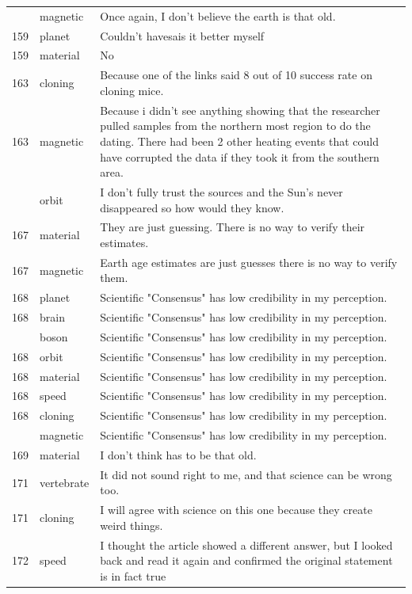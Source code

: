 \documentclass[
  doc,floatsintext]{apa6}
\begin{document}
\begin{longtable}[t]{>{}r>{}l>{\raggedright\arraybackslash}p{30em}}
\addlinespace
157 & magnetic & Once again, I don't believe the earth is that old.\\
159 & planet & Couldn't havesais it better myself\\
159 & material & No\\
163 & cloning & Because one of the links said 8 out of 10 success rate on cloning mice.\\
163 & magnetic & Because i didn't see anything showing that the researcher pulled samples from the northern most region to do the dating. There had been 2 other heating events that could have corrupted the data if they took it from the southern area.\\
\addlinespace
164 & orbit & I don't fully trust the sources and the Sun's never disappeared so how would they know.\\
167 & material & They are just guessing. There is no way to verify their estimates.\\
167 & magnetic & Earth age estimates are just guesses there is no way to verify them.\\
168 & planet & Scientific "Consensus" has low credibility in my perception.\\
168 & brain & Scientific "Consensus" has low credibility in my perception.\\
\addlinespace
168 & boson & Scientific "Consensus" has low credibility in my perception.\\
168 & orbit & Scientific "Consensus" has low credibility in my perception.\\
168 & material & Scientific "Consensus" has low credibility in my perception.\\
168 & speed & Scientific "Consensus" has low credibility in my perception.\\
168 & cloning & Scientific "Consensus" has low credibility in my perception.\\
\addlinespace
168 & magnetic & Scientific "Consensus" has low credibility in my perception.\\
169 & material & I don't think has to be that old.\\
171 & vertebrate & It did not sound right to me, and that science can be wrong too.\\
171 & cloning & I will agree with science on this one because they  create weird things.\\
172 & speed & I thought the article showed a different answer, but I looked back and read it again and confirmed the original statement is in fact true\\

\end{longtable}
\end{document}
